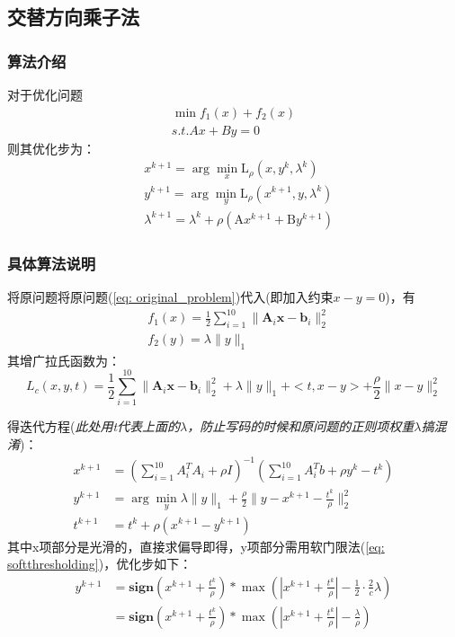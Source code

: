 \documentclass{article}
\begin{document}
\subsection{交替方向乘子法}
\subsubsection{算法介绍}
对于优化问题
\begin{align}
    \min f_1(x)+f_2(x) \\
    s.t. Ax+By = 0
\end{align}
则其优化步为：
\begin{align}
     & x^{k+1} = \arg\min_x \text{L}_\rho\left(x, y^k,\lambda^k\right)              \\
     & y^{k+1} = \arg\min_y \text{L}_\rho\left(x^{k+1}, y,\lambda^k\right)          \\
     & \lambda^{k+1} = \lambda^k + \rho\left(\text{A}x^{k+1}+\text{B}y^{k+1}\right)
\end{align}

\subsubsection{具体算法说明}
将原问题将原问题(\ref{eq: original_problem})代入(即加入约束$x-y=0$)，有
\begin{align}
     & f_1(x) = \frac {1}{2} \sum_{i=1}^{10} \|\mathbf{A}_i \mathbf{x} - \mathbf{b}_i\|_2^2 \\
     & f_2(y) = \lambda \|y\|_1
\end{align}
其增广拉氏函数为：
\begin{equation}
    L_c(x,y,t) = \frac {1}{2} \sum_{i=1}^{10} \|\mathbf{A}_i \mathbf{x} - \mathbf{b}_i\|_2^2+
    \lambda\|y\|_1+<t, x-y>+\frac{\rho}{2}\|x-y\|_2^2
    \label{eq: lc}
\end{equation}

得迭代方程(\emph{此处用t代表上面的$\lambda$，防止写码的时候和原问题的正则项权重$\lambda$搞混淆})：
\begin{align}
    x^{k+1} & = \left(\sum_{i=1}^{10} A_i^T A_i+\rho I\right)^{-1}\left(\sum_{i=1}^{10}A_i^T b +\rho y^k -t^k\right) \label{eq: 2.1} \\
    y^{k+1} & = \arg\min_y \lambda \|y\|_1 + \frac{\rho}{2}\|y-x^{k+1}-\frac{t^k}{\rho}\|_2^2 \label{eq: 2.2}                        \\
    t^{k+1} & = t^{k} + \rho(x^{k+1}-y^{k+1}) \label{eq: 2.3}
\end{align}
其中x项部分是光滑的，直接求偏导即得，y项部分需用软门限法(\ref{eq: softthresholding})，优化步如下：
\begin{align}
    y^{k+1} & = \mathbf{sign} (x^{k+1}+\frac{t^{k}}{\rho}) * \max (|x^{k+1}+\frac{t^{k}}{\rho}| - \frac{1}{2}\cdot\frac{2}{c}\lambda)   \\
            & = \mathbf{sign} (x^{k+1}+\frac{t^{k}}{\rho}) * \max (|x^{k+1}+\frac{t^{k}}{\rho}| - \frac{\lambda}{\rho}) \label{eq: 2.4}
\end{align}
\newpage
\end{document}
